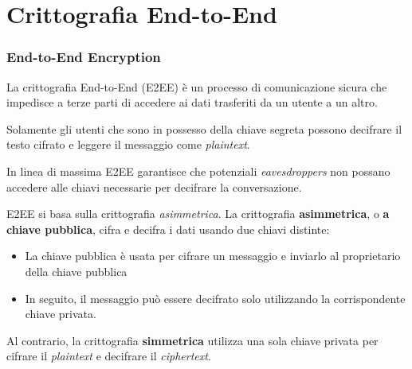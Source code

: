 \section{Crittografia End-to-End}
\begin{frame}
    \frametitle{End-to-End Encryption}
    La crittografia End-to-End (E2EE) è un processo di comunicazione sicura che impedisce a terze parti di accedere ai dati trasferiti da un utente a un altro.\newline\pause
    
    Solamente gli utenti che sono in possesso della chiave segreta possono decifrare il testo cifrato e leggere il messaggio come \textit{plaintext}.\newline\pause

    In linea di massima E2EE garantisce che potenziali \textit{eavesdroppers} non possano accedere alle chiavi necessarie per decifrare la conversazione. 
    \cite{greenbergE2EE}


\end{frame}

\begin{frame}
    E2EE si basa sulla crittografia \textit{asimmetrica}.\newline
    La crittografia \textbf{asimmetrica}, o \textbf{a chiave pubblica}, cifra e decifra i dati usando due chiavi distinte:\pause
    \begin{itemize}
        \item La chiave pubblica è usata per cifrare un messaggio e inviarlo al proprietario della chiave pubblica\pause
        \item In seguito, il messaggio può essere decifrato solo utilizzando la corrispondente chiave privata.\pause
    \end{itemize}

    Al contrario, la crittografia \textbf{simmetrica} utilizza una sola chiave privata per cifrare il \textit{plaintext} e decifrare il \textit{ciphertext}.


\end{frame}

